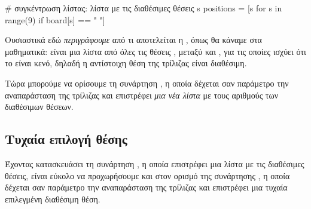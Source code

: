 \documentclass[a4paper,11pt,oneside]{book}
\begin{document}
\begin{pyplain}
# συγκέντρωση λίστας: λίστα με τις διαθέσιμες θέσεις s
positions = [s for s in range(9) if board[s] == " "]
\end{pyplain}

Ουσιαστικά εδώ \emph{περιγράφουμε} από τι αποτελείται η , όπως θα κάναμε στα μαθηματικά: είναι μια λίστα από όλες τις θέσεις , μεταξύ  και , για τις οποίες ισχύει ότι το  είναι κενό, δηλαδή η αντίστοιχη θέση της τρίλιζας είναι διαθέσιμη.

Τώρα μπορούμε να ορίσουμε τη συνάρτηση , η οποία δέχεται σαν παράμετρο την αναπαράσταση  της τρίλιζας και επιστρέφει \emph{μια νέα λίστα} με τους αριθμούς των διαθέσιμων θέσεων.


\subsection{Τυχαία επιλογή θέσης}

Έχοντας κατασκευάσει τη συνάρτηση , η οποία επιστρέφει μια λίστα με τις διαθέσιμες θέσεις, είναι εύκολο να προχωρήσουμε και στον ορισμό της συνάρτησης , η οποία δέχεται σαν παράμετρο την αναπαράσταση  της τρίλιζας και επιστρέφει μια τυχαία επιλεγμένη διαθέσιμη θέση.


\end{document}
